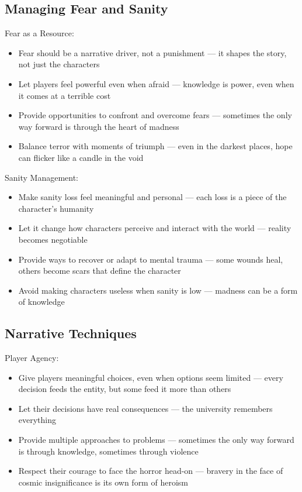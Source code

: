 \documentclass[11pt]{article}
\begin{document}
\subsection{Managing Fear and Sanity}

Fear as a Resource:
\begin{itemize}
\item Fear should be a narrative driver, not a punishment — it shapes the story, not just the characters
\item Let players feel powerful even when afraid — knowledge is power, even when it comes at a terrible cost
\item Provide opportunities to confront and overcome fears — sometimes the only way forward is through the heart of madness
\item Balance terror with moments of triumph — even in the darkest places, hope can flicker like a candle in the void
\end{itemize}

Sanity Management:
\begin{itemize}
\item Make sanity loss feel meaningful and personal — each loss is a piece of the character's humanity
\item Let it change how characters perceive and interact with the world — reality becomes negotiable
\item Provide ways to recover or adapt to mental trauma — some wounds heal, others become scars that define the character
\item Avoid making characters useless when sanity is low — madness can be a form of knowledge
\end{itemize}

\subsection{Narrative Techniques}

Player Agency:
\begin{itemize}
\item Give players meaningful choices, even when options seem limited — every decision feeds the entity, but some feed it more than others
\item Let their decisions have real consequences — the university remembers everything
\item Provide multiple approaches to problems — sometimes the only way forward is through knowledge, sometimes through violence
\item Respect their courage to face the horror head-on — bravery in the face of cosmic insignificance is its own form of heroism
\end{itemize}
\end{document}
